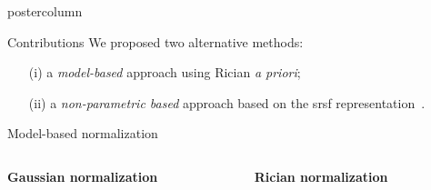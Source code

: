 \documentclass[final, size=a0]{beamer}
\begin{document}
\begin{frame}
\begin{columns}
\begin{column}{.33\textwidth}
\begin{beamercolorbox}[center,wd=\textwidth]{postercolumn}
\begin{minipage}[T]{.95\textwidth}
{            %
            \begin{exampleblock}{Contributions}
              We proposed two alternative methods:
              \begin{itemize}
              \item[(i)] a \emph{model-based} approach using Rician \textit{a priori};
              \item[(ii)] a \emph{non-parametric based} approach based on the \ac{srsf} representation~\cite{Srivastava2011}.
              \end{itemize}
            \end{exampleblock}

            \begin{alertblock}{Model-based normalization}
              
              \begin{columns}
                \begin{column}{.5\textwidth}
                  
                  \begin{center}
                    \textbf{Gaussian normalization}
                  \end{center}

                \end{column}
                \begin{column}{.5\textwidth}
                  \begin{center}
                    \textbf{Rician normalization}
                  \end{center}
                
                \end{column}
              \end{columns}



\end{alertblock}}
\end{minipage}
\end{beamercolorbox}
\end{column}
\end{columns}
\end{frame}
\end{document}

